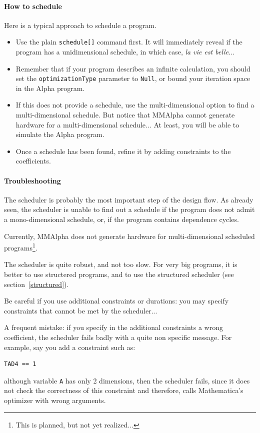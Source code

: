 \documentclass[12pt]{article}
\newcommand{\Alpha}{{\sc Alpha}}
\newcommand{\MMA}{{\sc MMAlpha}}
\newcommand{\alfa}{\Alpha}
\newcommand{\mmalpha}{\MMA}
\newcommand{\mma}{{Mathematica}}
\begin{document}
\paragraph*{How to schedule}
Here is a typical approach to schedule a program. 
\begin{itemize}
\item Use the plain \texttt{schedule[]} command first.
It will immediately reveal if the program has a unidimensional 
schedule, in which case, {\em la vie est belle}...
\item Remember that if your program describes an infinite
calculation, you should set the \texttt{optimizationType}
parameter to \texttt{Null}, or bound your iteration space
in the \alfa{} program.
\item If this does not provide a schedule, use the multi-dimensional
option to find a multi-dimensional schedule. But notice that 
\mmalpha{} cannot generate hardware for a multi-dimensional 
schedule... At least, you will be able to simulate the
\alfa{} program.
\item Once a schedule has been found, refine
it by adding constraints to the coefficients. 
\end{itemize}

\paragraph*{Troubleshooting}
The scheduler is probably the most important step of 
the design flow. As already seen, the scheduler is unable
to find out a schedule if the program does not admit a mono-dimensional 
schedule, or, if the program contains dependence cycles.

Currently, \mmalpha{} does not generate hardware for 
multi-dimensional scheduled programs\footnote{This is 
planned, but not yet realized...}. 

The scheduler is quite robust, and not too slow. For 
very big programs, it is better to use structered 
programs, and to use the structured scheduler (see section~\ref{structured}).

Be careful if you use additional constraints or durations: you may specify
constraints that cannot be met by the scheduler...

A frequent mistake: if you specify in the additional constraints a wrong coefficient, 
the scheduler fails badly with a quite non specific message. For example, say you add
a constraint such as:
\begin{verbatim}
TAD4 == 1
\end{verbatim}
although variable \texttt{A} has only 2 dimensions, then the scheduler fails, since it
does not check the correctness of this constraint and therefore, calls \mma{}'s 
optimizer with wrong arguments. 
\end{document}
